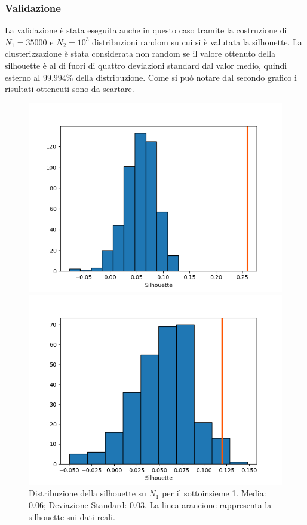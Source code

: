 \documentclass[a4paper,9pt]{article}
\begin{document}
\subsubsection{Validazione}
La validazione è stata eseguita anche in questo caso tramite la costruzione di $N_1=35000$ e $N_2=10^3$ distribuzioni random su cui si è valutata la silhouette. La clusterizzazione è stata considerata non random se il valore ottenuto della silhouette è al di fuori di quattro deviazioni standard dal valor medio, quindi esterno al $99.994\%$ della distribuzione.
Come si può notare dal secondo grafico i risultati otteneuti sono da scartare.
\begin{figure}[H]
\begin{minipage}[b]{0.45\textwidth}
\centering
\includegraphics[width=\textwidth]{RandomSilhouetteDBSCAN_1.png}
\caption{Distribuzione della silhouette su $N_1$ per il sottoinsieme 1. Media: 0.06; Deviazione Standard: 0.03. La linea arancione rappresenta la silhouette sui dati reali.  }
\label{etichetta1}
\end{minipage}
\hfill
\begin{minipage}[b]{0.45\textwidth}
\centering
\includegraphics[width=\textwidth]{RandomSilhouetteDBSCAN_2.png}

\end{minipage}
\end{figure}
\end{document}
